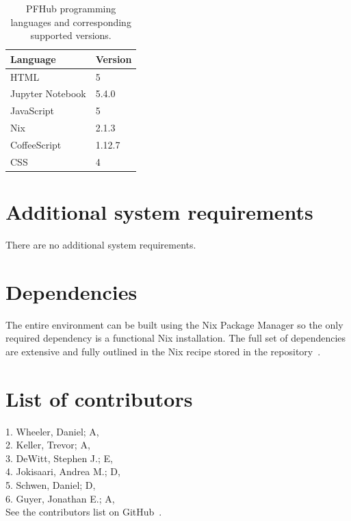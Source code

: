 \documentclass{jors}
\begin{document}
\begin{table}[h!]
  \centering
  \caption{PFHub programming languages and corresponding supported
    versions.}
  \begin{tabular}{|l|l|}
    \hline
    Language         & Version \\
    \hline
    HTML             & 5       \\
    Jupyter Notebook & 5.4.0   \\
    JavaScript       & 5       \\
    Nix              & 2.1.3   \\
    CoffeeScript     & 1.12.7  \\
    CSS              & 4       \\
    \hline
  \end{tabular}
  \label{tab:versions}
\end{table}


\section*{Additional system requirements}

There are no additional system requirements.

\section*{Dependencies}

The entire environment can be built using the Nix Package Manager so
the only required dependency is a functional Nix installation. The
full set of dependencies are extensive and fully outlined in the Nix
recipe stored in the repository~\cite{nix-recipe}.

\section*{List of contributors}

1. Wheeler, Daniel; A,  \\
2. Keller, Trevor; A,  \\
3. DeWitt, Stephen J.; E,  \\
4. Jokisaari, Andrea M.; D,  \\
5. Schwen, Daniel; D,  \\
6. Guyer, Jonathan E.; A,  \\

See the contributors list on GitHub~\cite{contributors}.
\end{document}
